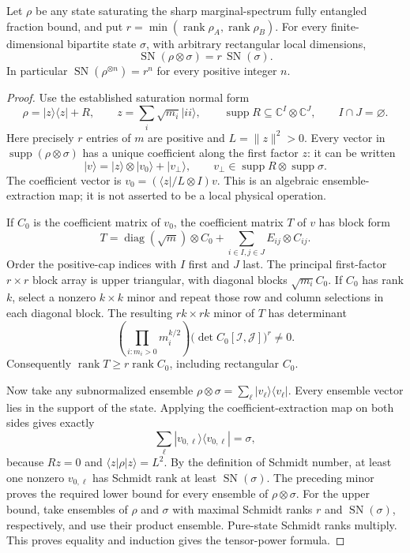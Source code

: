\begin{theorem}
\label{thm:universal-schmidt}
Let $\rho$ be any state saturating the sharp marginal-spectrum fully
entangled fraction bound, and put
$r=\min(\operatorname{rank}\rho_A,\operatorname{rank}\rho_B)$.
For every finite-dimensional bipartite state $\sigma$, with arbitrary
rectangular local dimensions,
\[
 \boxed{\quad \operatorname{SN}(\rho\otimes\sigma)
                      =r\,\operatorname{SN}(\sigma).\quad}
\]
In particular $\operatorname{SN}(\rho^{\otimes n})=r^n$ for every
positive integer $n$.
\end{theorem}
\begin{proof}
Use the established saturation normal form
\[
 \rho=|z\rangle\langle z|+R,\qquad
 z=\sum_i\sqrt{m_i}|ii\rangle,\qquad
 \operatorname{supp}R\subseteq\mathbb C^I\otimes\mathbb C^J,
 \qquad I\cap J=\varnothing.
\]
Here precisely $r$ entries of $m$ are positive and $L=\|z\|^2>0$.
Every vector in $\operatorname{supp}(\rho\otimes\sigma)$ has a unique
coefficient along the first factor $z$: it can be written
\[
       |v\rangle=|z\rangle\otimes|v_0\rangle+|v_\perp\rangle,
       \qquad v_\perp\in\operatorname{supp}R\otimes\operatorname{supp}\sigma.
\]
The coefficient vector is
$v_0=(\langle z|/L\otimes I)v$.
This is an algebraic ensemble-extraction map; it is not asserted to be a
local physical operation.

If $C_0$ is the coefficient matrix of $v_0$, the coefficient matrix $T$
of $v$ has block form
\[
       T=\operatorname{diag}(\sqrt m)\otimes C_0
                        +\sum_{i\in I,j\in J}E_{ij}\otimes C_{ij}.
\]
Order the positive-cap indices with $I$ first and $J$ last. The principal
first-factor $r\times r$ block array is upper triangular, with diagonal
blocks $\sqrt{m_i}C_0$. If $C_0$ has rank $k$, select a nonzero $k\times k$
minor and repeat those row and column selections in each diagonal block.
The resulting $rk\times rk$ minor of $T$ has determinant
\[
        \left(\prod_{i:m_i>0}m_i^{k/2}\right)
                               \bigl(\det C_0[\mathcal I,\mathcal J]\bigr)^r
                           \ne0.
\]
Consequently $\operatorname{rank}T\ge r\operatorname{rank}C_0$, including
rectangular $C_0$.

Now take any subnormalized ensemble
$\rho\otimes\sigma=\sum_\ell|v_\ell\rangle\langle v_\ell|$.
Every ensemble vector lies in the support of the state. Applying the
coefficient-extraction map on both sides gives exactly
\[
       \sum_\ell|v_{0,\ell}\rangle\langle v_{0,\ell}|=\sigma,
\]
because $Rz=0$ and $\langle z|\rho|z\rangle=L^2$.
By the definition of Schmidt number, at least one nonzero $v_{0,\ell}$
has Schmidt rank at least $\operatorname{SN}(\sigma)$. The preceding
minor proves the required lower bound for every ensemble of
$\rho\otimes\sigma$.
For the upper bound, take ensembles of $\rho$ and $\sigma$ with maximal
Schmidt ranks $r$ and $\operatorname{SN}(\sigma)$, respectively, and use
their product ensemble. Pure-state Schmidt ranks multiply. This proves
equality and induction gives the tensor-power formula.
\end{proof}

